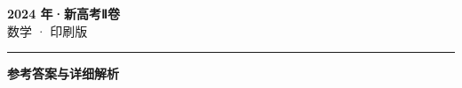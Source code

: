 \documentclass[zihao=5, a4paper]{ctexart}
\begin{document}
\begin{center}
  {\Large\bfseries 2024 年·新高考Ⅱ卷}\\[4pt]
  {\large 数学 · 印刷版}
\end{center}
\medskip
{}

\par\bigskip\hrule\bigskip
{}
\begin{center}{\large\bfseries 参考答案与详细解析}\end{center}
\smallskip

\end{document}
